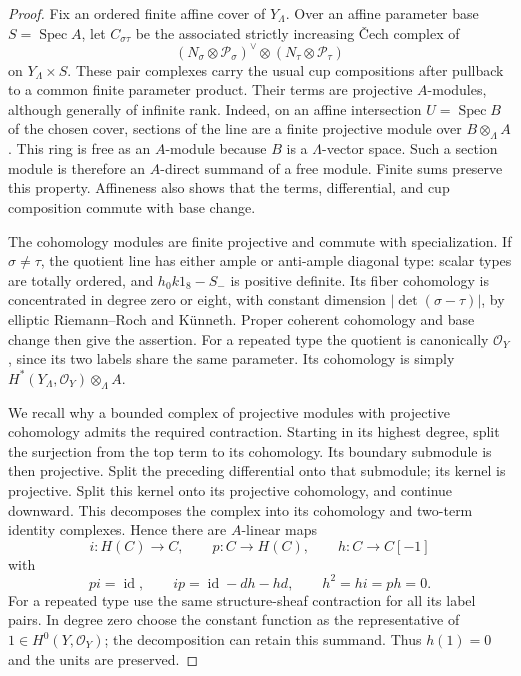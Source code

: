 \documentclass[11pt]{article}
\theoremstyle{definition}
\theoremstyle{remark}
\DeclareMathOperator{\Spec}{Spec}
\DeclareMathOperator{\id}{id}
\newcommand{\cO}{\mathcal O}
\numberwithin{equation}{section}
\begin{document}
\begin{proof}
Fix an ordered finite affine cover of $Y_\Lambda$.  Over an affine
parameter base $S=\Spec A$, let $C_{\sigma\tau}$ be the associated
strictly increasing \v Cech complex of
\[
 (N_\sigma\otimes\mathcal P_\sigma)^\vee
          \otimes(N_\tau\otimes\mathcal P_\tau)
\]
on $Y_\Lambda\times S$.  These pair complexes carry the usual cup
compositions after pullback to a common finite parameter product.
Their terms are projective $A$-modules, although generally of
infinite rank.  Indeed, on an affine intersection $U=\Spec B$ of
the chosen cover, sections of the line are a finite projective
module over $B\otimes_\Lambda A$.  This ring is free as an
$A$-module because $B$ is a $\Lambda$-vector space.  Such a section
module is therefore an $A$-direct summand of a free module.  Finite
sums preserve this property.  Affineness also shows that the terms,
differential, and cup composition commute with base change.

The cohomology modules are finite projective and commute with
specialization.  If $\sigma\ne\tau$, the quotient line has either
ample or anti-ample diagonal type: scalar types are totally ordered,
and $h_0k1_8-S_-$ is positive definite.  Its fiber cohomology is
concentrated in degree zero or eight, with constant dimension
$|\det(\sigma-\tau)|$, by elliptic Riemann--Roch and K\"unneth.
Proper coherent cohomology and base change then give the assertion.
For a repeated type the quotient is canonically $\cO_Y$, since its
two labels share the same parameter.  Its cohomology is simply
$H^*(Y_\Lambda,\cO_Y)\otimes_\Lambda A$.

We recall why a bounded complex of projective modules with
projective cohomology admits the required contraction.  Starting
in its highest degree, split the surjection from the top term to
its cohomology.  Its boundary submodule is then projective.  Split
the preceding differential onto that submodule; its kernel is
projective.  Split this kernel onto its projective cohomology, and
continue downward.  This decomposes the complex into its cohomology
and two-term identity complexes.  Hence there are $A$-linear maps
\[
 i:H(C)\to C,\qquad p:C\to H(C),\qquad h:C\to C[-1]
\]
with
\begin{equation}
 pi=\id,\qquad ip=\id-dh-hd,\qquad
 h^2=hi=ph=0.
 \label{mirror:contraction}
\end{equation}
For a repeated type use the same structure-sheaf contraction for
all its label pairs.  In degree zero choose the constant function
as the representative of $1\in H^0(Y,\cO_Y)$; the decomposition
can retain this summand.  Thus $h(1)=0$ and the units are preserved.


\end{proof}
\end{document}
